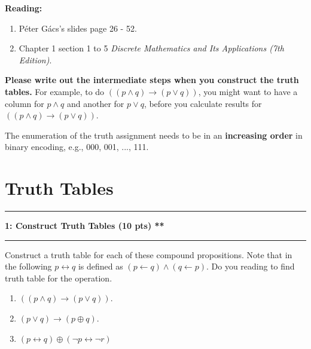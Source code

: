 \documentclass[11pt]{article}
\newcommand\question[2]{\vspace{.25in}\hrule\textbf{#1: #2}\vspace{.5em}\hrule\vspace{.10in}}
\begin{document}
\raggedright
\newcommand\NAME{Xiang Huang}  %
\newcommand\UISID{\texttt{NetID}}     %
\newcommand\HWNUM{1}              %




\textbf{Reading:}
\begin{enumerate}
    \item P\'eter G\'acs's slides page 26 - 52.
    \item Chapter 1 section 1 to 5 \textit{Discrete Mathematics and Its Applications (7th Edition)}.
\end{enumerate}

\textbf{Please write out the intermediate steps when you construct the truth tables.} For example, to do $((p \land q) \to (p \lor q))$, you might want to have a column for $p\land q$ and another for $p\lor q$, before you calculate results for $((p \land q) \to (p \lor q))$.

The enumeration of the truth assignment needs to be in an \textbf{increasing order} in binary encoding, e.g., 000, 001, ..., 111.
\section{Truth Tables}
\question{1}{Construct Truth Tables (10 pts) **}
Construct a truth table for each of these compound propositions. Note that in the following $p\leftrightarrow q$ is defined as $(p\leftarrow q)\land (q\leftarrow p)$. Do you reading to find truth table for the operation.
\begin{enumerate}
    \item $((p \land q) \to (p \lor q))$.
    \item $(p\lor q)\to (p\oplus q)$.
    \item $(p \leftrightarrow q) \oplus (\neg p \leftrightarrow \neg r)$
\end{enumerate}
\end{document}
